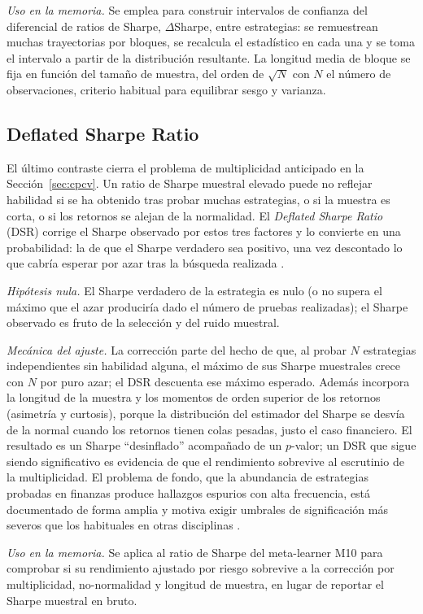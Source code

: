 \emph{Uso en la memoria.} Se emplea para construir intervalos de confianza del diferencial de ratios de Sharpe, $\Delta$Sharpe, entre estrategias: se remuestrean muchas trayectorias por bloques, se recalcula el estadístico en cada una y se toma el intervalo a partir de la distribución resultante. La longitud media de bloque se fija en función del tamaño de muestra, del orden de $\sqrt{N}$ con $N$ el número de observaciones, criterio habitual para equilibrar sesgo y varianza.

\subsection{Deflated Sharpe Ratio}
\label{sec:tests-dsr}

El último contraste cierra el problema de multiplicidad anticipado en la Sección~\ref{sec:cpcv}. Un ratio de Sharpe muestral elevado puede no reflejar habilidad si se ha obtenido tras probar muchas estrategias, o si la muestra es corta, o si los retornos se alejan de la normalidad. El \emph{Deflated Sharpe Ratio} (DSR) corrige el Sharpe observado por estos tres factores y lo convierte en una probabilidad: la de que el Sharpe verdadero sea positivo, una vez descontado lo que cabría esperar por azar tras la búsqueda realizada \cite{bailey2014}.

\emph{Hipótesis nula.} El Sharpe verdadero de la estrategia es nulo (o no supera el máximo que el azar produciría dado el número de pruebas realizadas); el Sharpe observado es fruto de la selección y del ruido muestral.

\emph{Mecánica del ajuste.} La corrección parte del hecho de que, al probar $N$ estrategias independientes sin habilidad alguna, el máximo de sus Sharpe muestrales crece con $N$ por puro azar; el DSR descuenta ese máximo esperado. Además incorpora la longitud de la muestra y los momentos de orden superior de los retornos (asimetría y curtosis), porque la distribución del estimador del Sharpe se desvía de la normal cuando los retornos tienen colas pesadas, justo el caso financiero. El resultado es un Sharpe ``desinflado'' acompañado de un $p$-valor; un DSR que sigue siendo significativo es evidencia de que el rendimiento sobrevive al escrutinio de la multiplicidad. El problema de fondo, que la abundancia de estrategias probadas en finanzas produce hallazgos espurios con alta frecuencia, está documentado de forma amplia y motiva exigir umbrales de significación más severos que los habituales en otras disciplinas \cite{harvey2016}.

\emph{Uso en la memoria.} Se aplica al ratio de Sharpe del meta-learner M10 para comprobar si su rendimiento ajustado por riesgo sobrevive a la corrección por multiplicidad, no-normalidad y longitud de muestra, en lugar de reportar el Sharpe muestral en bruto.

